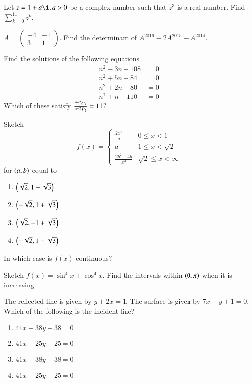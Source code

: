 \documentclass[journal,12pt,onecolumn]{IEEEtran}
\begin{document}
\begin{problem}
Let $z = 1 + a \i, a > 0$  be a complex number such that $z^3$ is a real number. Find $\sum_{k = 0}^{11}z^k$.
\end{problem}
\begin{problem}
$A = 
\begin{pmatrix}
-4 & -1 \\
3 & 1
\end{pmatrix}
$.
Find the determinant of $A^{2016}-2A^{2015}-A^{2014}$.
\end{problem}
\begin{problem}
Find the solutions of the following equations
\begin{align*}
n^2-3n-108 &= 0 \\
n^2 + 5n -84 &= 0 \\
n^2 + 2n - 80 &=0 \\
n^2+n-110 &= 0
\end{align*}
Which of these satisfy $\frac{\,^{n+2}C_{6}}{\,^{n-2}P_{2}} = 11$?
\end{problem}		
\begin{problem}
Sketch 
\begin{equation*}
f(x) = 
\begin{cases}
\frac{2x^2}{a} & 0 \leq x < 1\\
a & 1 \leq x < \sqrt{2} \\
\frac{2b^2 - 4b}{x^3} & \sqrt{2} \leq x < \infty
\end{cases}
\end{equation*}
for $\left(a,b\right)$ equal to 
\begin{enumerate}
\item $\left(\sqrt{2}, 1 - \sqrt{3}\right)$
\item $\left(-\sqrt{2}, 1 + \sqrt{3}\right)$
\item $\left(\sqrt{2},-1+\sqrt{3}\right)$
\item $\left(-\sqrt{2}, 1 - \sqrt{3}\right)$
\end{enumerate}
In which case is  $f(x)$ continuous?
\end{problem}
\begin{problem}
Sketch $f(x) = \sin^4x + \cos^4x$. Find the intervals within $\left(0,\pi\right)$ when it is increasing.
\end{problem}
\begin{problem}
The reflected line is given by $y+2x=1$. The surface is given by $7x-y+1=0$. Which of the following is the incident line?
\begin{enumerate}
\item $41x - 38y +38 = 0$
\item $41x +25y - 25 = 0$
\item $41x + 38y-38=0$
\item $41x-25y+25=0$
\end{enumerate}
\end{problem}
\end{document}
